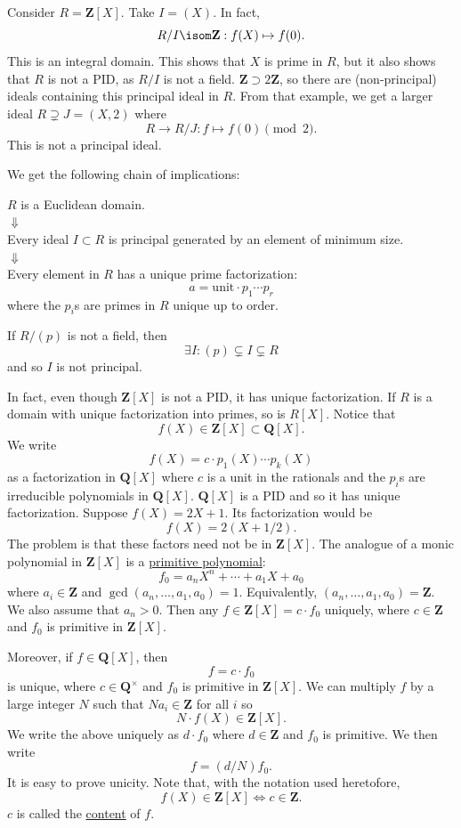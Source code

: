 \documentclass[11pt, oneside]{amsart}
\numberwithin{equation}{section}
\numberwithin{theorem}{section}
\theoremstyle{definition}
\def\Z{\mathbf{Z}}
\def\Q{\mathbf{Q}}
\begin{document}
{Consider $R = \Z[X]$. Take $I = (X)$. In fact, 
$$
R/I \isom \Z : f(X)\mapsto f(0).
$$
This is an integral domain. This shows that $X$ is prime in $R$, but it also shows that $R$ is not a PID, as $R/I$ is not a field. $\Z\supset 2\Z$, so there are (non-principal) ideals containing this principal ideal in $R$. From that example, we get a larger ideal $R\supsetneq J=(X,2)$ where 
$$
R\to R/J : f\mapsto f(0)\pmod 2.
$$
This is not a principal ideal. 

We get the following chain of implications:\\

{\centering
$R$ is a Euclidean domain.\\
$\Downarrow$\\
Every ideal $I\subset R$ is principal generated by an element of minimum size. \\
$\Downarrow$\\
Every element in $R$ has a unique prime factorization:
$$
a = \mathrm{unit}\cdot p_1\cdots p_r
$$
where the $p_i$s are primes in $R$ unique up to order. \par}

If $R/(p)$ is not a field, then 
$$
\exists I : (p) \subsetneq I \subsetneq R
$$
and so $I$ is not principal.

In fact, even though $\Z[X]$ is not a PID, it has unique factorization. If $R$ is a domain with unique factorization into primes, so is $R[X]$. Notice that 
$$
f(X) \in \Z[X]\subset \Q[X].
$$
We write 
$$
f(X) = c\cdot p_1(X)\cdots p_k(X)
$$
as a factorization in $\Q[X]$ where $c$ is a unit in the rationals and the $p_i$s are irreducible polynomials in $\Q[X]$. $\Q[X]$ is a PID and so it has unique factorization. Suppose $f(X) =2X + 1$. Its factorization would be
$$
f(X) = 2(X+1/2).
$$
The problem is that these factors need not be in $\Z[X]$. The analogue of a monic polynomial in $\Z[X]$ is a \underline{primitive polynomial}:
$$
f_0 = a_nX^n +\cdots + a_1X + a_0
$$
where $a_i \in\Z$ and $\gcd(a_n,\hdots,a_1,a_0) =1$. Equivalently, $(a_n,\hdots,a_1,a_0) = \Z$. We also assume that $a_n > 0$. Then any $f\in \Z[X] = c\cdot f_0$ uniquely, where $c\in\Z$ and $f_0$ is primitive in $\Z[X]$.

Moreover, if $f\in\Q[X]$, then 
$$
f = c\cdot f_0
$$
is unique, where $c\in\Q^\times$ and $f_0$ is primitive in $\Z[X]$. We can multiply $f$ by a large integer $N$ such that $Na_i\in \Z$ for all $i$ so
$$
N\cdot f(X)\in \Z[X].
$$ 
We write the above uniquely as $d\cdot f_0$ where $d\in\Z$ and $f_0$ is primitive. We then write  
$$
f = (d/N)f_0. 
$$
It is easy to prove unicity. Note that, with the notation used heretofore,
$$
f(X)\in\Z[X] \iff c\in \Z.
$$
$c$ is called the \underline{content} of $f$.

}
\end{document}
